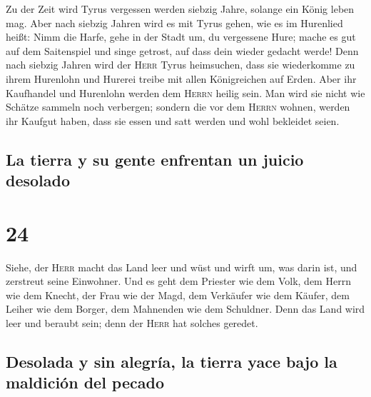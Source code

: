  Zu der Zeit wird Tyrus vergessen werden siebzig Jahre,
solange ein König leben mag. Aber nach siebzig Jahren wird es mit Tyrus
gehen, wie es im Hurenlied heißt:  Nimm die Harfe, gehe
in der Stadt um, du vergessene Hure; mache es gut auf dem Saitenspiel
und singe getrost, auf dass dein wieder gedacht werde! 
Denn nach siebzig Jahren wird der \textsc{Herr} Tyrus heimsuchen, dass
sie wiederkomme zu ihrem Hurenlohn und Hurerei treibe mit allen
Königreichen auf Erden.  Aber ihr Kaufhandel und
Hurenlohn werden dem \textsc{Herrn} heilig sein. Man wird sie nicht wie
Schätze sammeln noch verbergen; sondern die vor dem \textsc{Herrn}
wohnen, werden ihr Kaufgut haben, dass sie essen und satt werden und
wohl bekleidet seien.

\hypertarget{la-tierra-y-su-gente-enfrentan-un-juicio-desolado}{%
\subsection{La tierra y su gente enfrentan un juicio
desolado}\label{la-tierra-y-su-gente-enfrentan-un-juicio-desolado}}

\hypertarget{section-23}{%
\section{24}\label{section-23}}

 Siehe, der \textsc{Herr} macht das Land leer und wüst und
wirft um, was darin ist, und zerstreut seine Einwohner. 
Und es geht dem Priester wie dem Volk, dem Herrn wie dem Knecht, der
Frau wie der Magd, dem Verkäufer wie dem Käufer, dem Leiher wie dem
Borger, dem Mahnenden wie dem Schuldner.  Denn das Land
wird leer und beraubt sein; denn der \textsc{Herr} hat solches geredet.

\hypertarget{desolada-y-sin-alegruxeda-la-tierra-yace-bajo-la-maldiciuxf3n-del-pecado}{%
\subsection{Desolada y sin alegría, la tierra yace bajo la maldición del
pecado}\label{desolada-y-sin-alegruxeda-la-tierra-yace-bajo-la-maldiciuxf3n-del-pecado}}

